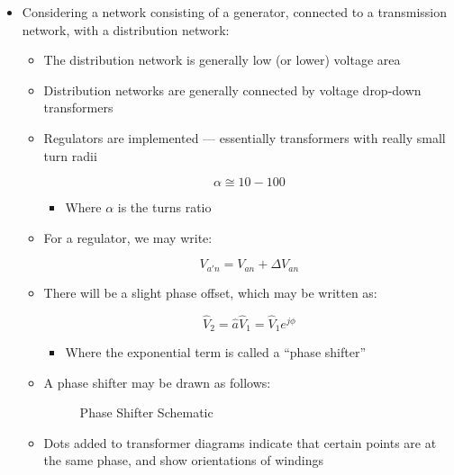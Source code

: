 \begin{itemize}

  \item Considering a network consisting of a generator, connected to a transmission network, with a distribution network:

    \begin{itemize}

      \item The distribution network is generally low (or lower) voltage area

      \item Distribution networks are generally connected by voltage drop-down transformers

      \item Regulators are implemented — essentially transformers with really small turn radii

        $$\alpha\cong 10-100$$

        \begin{itemize}

          \item Where $\alpha$ is the turns ratio

        \end{itemize}

      \item For a regulator, we may write:

        $$V_{a'n}=V_{an}+\Delta V_{an}$$

      \item There will be a slight phase offset, which may be written as:

        $$\hat{V}_2=\hat{a}\hat{V}_1=\hat{V}_1e^{j\phi}$$

        \begin{itemize}

          \item Where the exponential term is called a ``phase shifter''

        \end{itemize}

      \item A phase shifter may be drawn as follows:

        \begin{figure}[H]
          \centering
          
          \caption{Phase Shifter Schematic}
          \label{fig:1}
        \end{figure}

      \item Dots added to transformer diagrams indicate that certain points are at the same phase, and show orientations of windings


\end{itemize}
\end{itemize}
